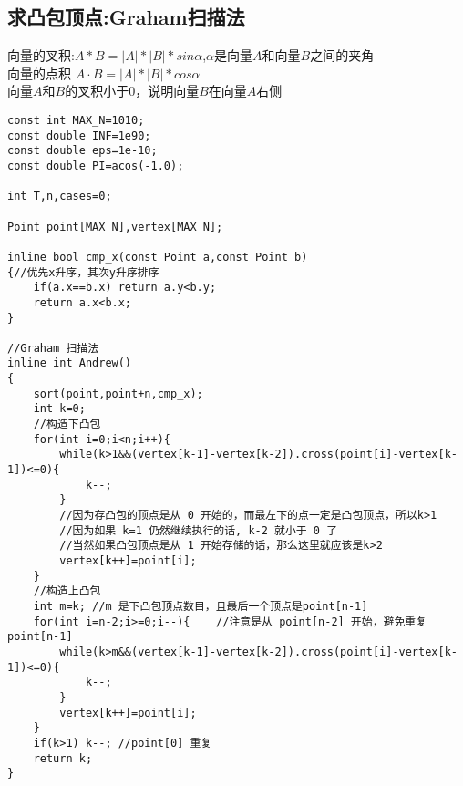 \subsection{求凸包顶点:Graham扫描法}
向量的叉积:$A * B =|A|*|B|*sin \alpha$,$\alpha$是向量$A$和向量$B$之间的夹角 \\
向量的点积 $A · B =|A|*|B|*cos\alpha$ \\
向量$A$和$B$的叉积小于0，说明向量$B$在向量$A$右侧
\begin{lstlisting}
const int MAX_N=1010;
const double INF=1e90;
const double eps=1e-10;
const double PI=acos(-1.0);

int T,n,cases=0;

Point point[MAX_N],vertex[MAX_N];

inline bool cmp_x(const Point a,const Point b)
{//优先x升序，其次y升序排序
    if(a.x==b.x) return a.y<b.y;
    return a.x<b.x;
}

//Graham 扫描法
inline int Andrew()
{
    sort(point,point+n,cmp_x);
    int k=0;
    //构造下凸包
    for(int i=0;i<n;i++){
        while(k>1&&(vertex[k-1]-vertex[k-2]).cross(point[i]-vertex[k-1])<=0){
            k--;
        }
        //因为存凸包的顶点是从 0 开始的，而最左下的点一定是凸包顶点，所以k>1
        //因为如果 k=1 仍然继续执行的话, k-2 就小于 0 了
        //当然如果凸包顶点是从 1 开始存储的话，那么这里就应该是k>2
        vertex[k++]=point[i];
    }
    //构造上凸包
    int m=k; //m 是下凸包顶点数目，且最后一个顶点是point[n-1]
    for(int i=n-2;i>=0;i--){    //注意是从 point[n-2] 开始，避免重复point[n-1]
        while(k>m&&(vertex[k-1]-vertex[k-2]).cross(point[i]-vertex[k-1])<=0){
            k--;
        }
        vertex[k++]=point[i];
    }
    if(k>1) k--; //point[0] 重复
    return k;
}
\end{lstlisting}

